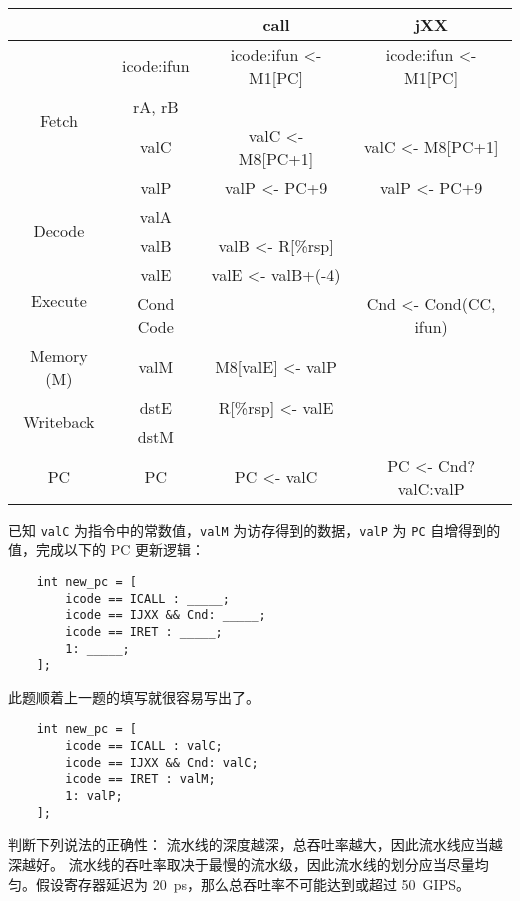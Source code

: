 \begin{problems}
\begin{table}[H]
            \tt
            \centering
            \begin{tabular}{|c|c|c|c|}
                \hline
                &  & call & jXX \\ \hline
                \multirow{4}{*}{Fetch} & icode:ifun & icode:ifun <- M1[PC] & icode:ifun <- M1[PC] \\ \cline{2-4} 
                & rA, rB &  &  \\ \cline{2-4} 
                & valC & valC <- M8[PC+1] & valC <- M8[PC+1] \\ \cline{2-4} 
                & valP & valP <- PC+9 & valP <- PC+9 \\ \hline
                \multirow{2}{*}{Decode} & valA &  &  \\ \cline{2-4} 
                & valB & valB <- R[\%rsp] &  \\ \hline
                \multirow{2}{*}{Execute} & valE & valE <- valB+(-4) &  \\ \cline{2-4} 
                & Cond Code &  & Cnd <- Cond(CC, ifun) \\ \hline
                Memory (M) & valM & M8[valE] <- valP &  \\ \hline
                \multirow{2}{*}{Writeback} & dstE & R[\%rsp] <- valE &  \\ \cline{2-4} 
                & dstM &  &  \\ \hline
                PC & PC & PC <- valC & PC <- Cnd?valC:valP \\ \hline
            \end{tabular}
        \end{table}
        \pro 已知 \verb|valC| 为指令中的常数值，\verb|valM| 为访存得到的数据，\verb|valP| 为 \verb|PC| 自增得到的值，完成以下的 PC 更新逻辑：
        \begin{verbatim}
    int new_pc = [
        icode == ICALL : _____;
        icode == IJXX && Cnd: _____;
        icode == IRET : _____;
        1: _____;
    ];
        \end{verbatim}
        \sol 此题顺着上一题的填写就很容易写出了。
        \begin{verbatim}
    int new_pc = [
        icode == ICALL : valC;
        icode == IJXX && Cnd: valC;
        icode == IRET : valM;
        1: valP;
    ];
        \end{verbatim}
        \pro 判断下列说法的正确性：
            \qn 流水线的深度越深，总吞吐率越大，因此流水线应当越深越好。
            \qn 流水线的吞吐率取决于最慢的流水级，因此流水线的划分应当尽量均匀。\qn 假设寄存器延迟为 \SI{20}{ps}，那么总吞吐率不可能达到或超过 \SI{50}{GIPS}。

\end{problems}
